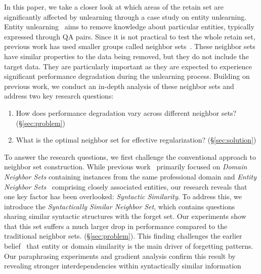 In this paper, we take a closer look at which areas of the retain set are significantly affected by unlearning through a case study on entity unlearning. Entity unlearning~\citep{maini2024tofu,rwku} aims to remove knowledge about particular entities, typically expressed through QA pairs. 
Since it is not practical to test the whole retain set, previous work has used smaller groups called neighbor sets~\cite{choi2024opt, closerlookat}.
These neighbor sets have similar properties to the data being removed, but they do not include the target data.
They are particularly important as they are expected to experience significant performance degradation during the unlearning process. 
Building on previous work, we conduct an in-depth analysis of these neighbor sets and address two key research questions:
\begin{enumerate}[wide, labelwidth=!, label={\textbf{RQ\arabic*.}}, labelindent=0pt, topsep=2pt, itemsep=-1pt, itemindent=0pt, leftmargin=*, before=\setlength{\listparindent}{-\leftmargin}]
\item How does performance degradation vary across different neighbor sets? (\S\ref{sec:problem})
\item What is the optimal neighbor set for effective regularization?  (\S\ref{sec:solution})
\end{enumerate}

To answer the research questions, we first challenge the conventional approach to neighbor set construction. 
While previous work~\cite{choi2024opt, closerlookat} primarily focused on \textit{Domain Neighbor Sets} containing instances from the same professional domain and \textit{Entity Neighbor Sets}~\cite{rwku, choi2024opt} comprising closely associated entities,
our research reveals that one key factor has been overlooked:  \textit{Syntactic Similarity}. To address this, we introduce the \textit{Syntactically Similar Neighbor Set}, which contains questions sharing similar syntactic structures with the forget set. 
Our experiments show that this set suffers a much larger drop in performance compared to the traditional neighbor sets. (\S\ref{sec:problem}). 
This finding challenges the earlier belief~\cite{closerlookat} that entity or domain similarity is the main driver of forgetting patterns. Our paraphrasing experiments and gradient analysis confirm this result by revealing stronger interdependencies within syntactically similar information

